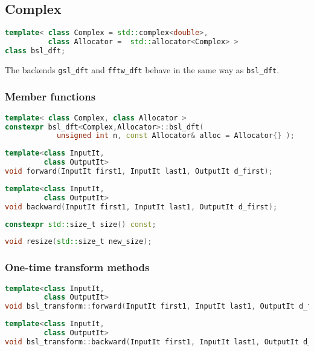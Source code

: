 \subsection{Complex \dft}

\begin{lstlisting}[language=C++]
template< class Complex = std::complex<double>, 
          class Allocator =  std::allocator<Complex> >
class bsl_dft;
\end{lstlisting}

The backends \verb|gsl_dft| and \verb|fftw_dft| behave in the same way as
\verb|bsl_dft|.

\subsubsection{Member functions}

\begin{lstlisting}[language=C++]
template< class Complex, class Allocator >
constexpr bsl_dft<Complex,Allocator>::bsl_dft(
            unsigned int n, const Allocator& alloc = Allocator{} );
\end{lstlisting}
\begin{lstlisting}[language=C++]
template<class InputIt,
         class OutputIt>
void forward(InputIt first1, InputIt last1, OutputIt d_first);
\end{lstlisting}
\begin{lstlisting}[language=C++]
template<class InputIt,
         class OutputIt>
void backward(InputIt first1, InputIt last1, OutputIt d_first);
\end{lstlisting}
\begin{lstlisting}[language=C++]
constexpr std::size_t size() const;
\end{lstlisting}
\begin{lstlisting}[language=C++]
void resize(std::size_t new_size);
\end{lstlisting}

\subsubsection{One-time transform methods}

\begin{lstlisting}[language=C++]
template<class InputIt,
         class OutputIt>
void bsl_transform::forward(InputIt first1, InputIt last1, OutputIt d_first);
\end{lstlisting}
\begin{lstlisting}[language=C++]
template<class InputIt,
         class OutputIt>
void bsl_transform::backward(InputIt first1, InputIt last1, OutputIt d_first);
\end{lstlisting}

